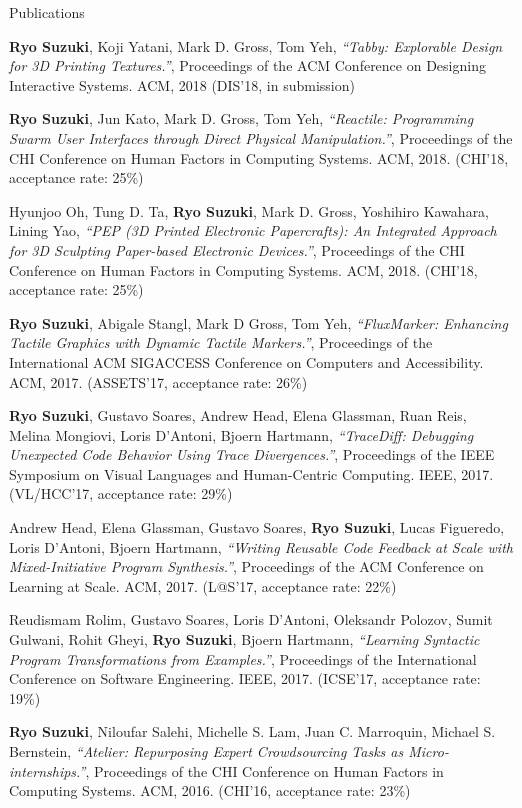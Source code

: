\documentclass{resume} %
\begin{document}
\begin{rSection}{Publications}

{\bf Ryo Suzuki}, Koji Yatani, Mark D. Gross, Tom Yeh,
{\it ``Tabby: Explorable Design for 3D Printing Textures.''},
Proceedings of the ACM Conference on Designing Interactive Systems. ACM, 2018
(DIS'18, in submission)

{\bf Ryo Suzuki}, Jun Kato, Mark D. Gross, Tom Yeh,
{\it ``Reactile: Programming Swarm User Interfaces through Direct Physical Manipulation.''},
Proceedings of the CHI Conference on Human Factors in Computing Systems. ACM, 2018. 
(CHI'18, acceptance rate: 25\%)

Hyunjoo Oh, Tung D. Ta, {\bf Ryo Suzuki}, Mark D. Gross, Yoshihiro Kawahara, Lining Yao,
{\it ``PEP (3D Printed Electronic Papercrafts): An Integrated Approach for 3D Sculpting Paper-based Electronic Devices.''},
Proceedings of the CHI Conference on Human Factors in Computing Systems. ACM, 2018. 
(CHI'18, acceptance rate: 25\%)

{\bf Ryo Suzuki}, Abigale Stangl, Mark D Gross, Tom Yeh,
{\it ``FluxMarker: Enhancing Tactile Graphics with Dynamic Tactile Markers.''}, 
Proceedings of the International ACM SIGACCESS Conference on Computers and Accessibility. ACM, 2017. 
(ASSETS'17, acceptance rate: 26\%)

{\bf Ryo Suzuki}, Gustavo Soares, Andrew Head, Elena Glassman, Ruan Reis, Melina Mongiovi, Loris D'Antoni, Bjoern Hartmann,
{\it ``TraceDiff: Debugging Unexpected Code Behavior Using Trace Divergences.''},
Proceedings of the IEEE Symposium on Visual Languages and Human-Centric Computing. IEEE, 2017. 
(VL/HCC'17, acceptance rate: 29\%)

Andrew Head, Elena Glassman, Gustavo Soares, {\bf Ryo Suzuki}, Lucas Figueredo, Loris D'Antoni, Bjoern Hartmann, 
{\it ``Writing Reusable Code Feedback at Scale with Mixed-Initiative Program Synthesis.''}, 
Proceedings of the ACM Conference on Learning at Scale. ACM, 2017. 
(L@S'17, acceptance rate: 22\%)

Reudismam Rolim, Gustavo Soares, Loris D'Antoni, Oleksandr Polozov, Sumit Gulwani, Rohit Gheyi, {\bf Ryo Suzuki}, Bjoern Hartmann, 
{\it ``Learning Syntactic Program Transformations from Examples.''}, 
Proceedings of the International Conference on Software Engineering. IEEE, 2017. 
(ICSE'17, acceptance rate: 19\%)

{\bf Ryo Suzuki}, Niloufar Salehi, Michelle S. Lam,
Juan C. Marroquin, Michael S. Bernstein,
{\it ``Atelier: Repurposing Expert Crowdsourcing Tasks as Micro-internships.''}, 
Proceedings of the CHI Conference on Human Factors in Computing Systems. ACM, 2016. 
(CHI'16, acceptance rate: 23\%)

\end{rSection}
\end{document}
